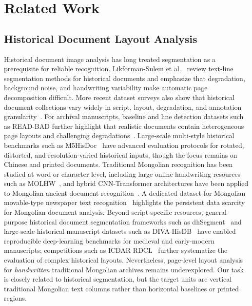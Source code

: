 \documentclass[pdflatex,sn-mathphys-num]{sn-jnl}
\begin{document}
\section{Related Work}
\subsection{Historical Document Layout Analysis}
Historical document image analysis has long treated segmentation as a prerequisite for reliable recognition. Likforman-Sulem et al.~\cite{likforman2007textline} review text-line segmentation methods for historical documents and emphasize that degradation, background noise, and handwriting variability make automatic page decomposition difficult. More recent dataset surveys also show that historical document collections vary widely in script, layout, degradation, and annotation granularity~\cite{nikolaidou2022survey}. For archival manuscripts, baseline and line detection datasets such as READ-BAD further highlight that realistic documents contain heterogeneous page layouts and challenging degradations~\cite{gruning2017readbad}. Large-scale multi-style historical benchmarks such as M5HisDoc~\cite{shi2023m5hisdoc} have advanced evaluation protocols for rotated, distorted, and resolution-varied historical inputs, though the focus remains on Chinese and printed documents. Traditional Mongolian recognition has been studied at word or character level, including large online handwriting resources such as MOLHW~\cite{pan2023molhw}, and hybrid CNN-Transformer architectures have been applied to Mongolian ancient document recognition~\cite{sun2023mongolian}. A dedicated dataset for Mongolian movable-type newspaper text recognition~\cite{lu2024mongolian} highlights the persistent data scarcity for Mongolian document analysis. Beyond script-specific resources, general-purpose historical document segmentation frameworks such as dhSegment~\cite{oliveira2018dhsegment} and large-scale historical manuscript datasets such as DIVA-HisDB~\cite{simistira2016diva} have enabled reproducible deep-learning benchmarks for medieval and early-modern manuscripts; competitions such as ICDAR RDCL~\cite{clausner2019icdar} further systematize the evaluation of complex historical layouts. Nevertheless, page-level layout analysis for \emph{handwritten} traditional Mongolian archives remains underexplored. Our task is closely related to historical segmentation, but the target units are vertical traditional Mongolian text columns rather than horizontal baselines or printed regions.
\end{document}

